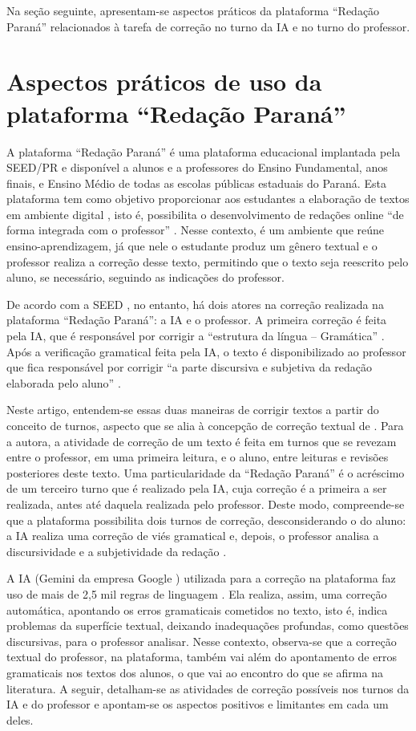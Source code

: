 \documentclass[portuguese]{textolivre}
\begin{document}
Na seção seguinte, apresentam-se aspectos práticos da plataforma ``Redação Paraná'' relacionados à tarefa de correção no turno da IA e no turno do professor.

\section{Aspectos práticos de uso da plataforma ``Redação Paraná''}
A plataforma ``Redação Paraná'' é uma plataforma educacional implantada pela SEED/PR e disponível a alunos e a professores do Ensino Fundamental, anos finais, e Ensino Médio de todas as escolas públicas estaduais do Paraná. Esta plataforma tem como objetivo proporcionar aos estudantes a elaboração de textos em ambiente digital \cite{parana2023}, isto é, possibilita o desenvolvimento de redações online ``de forma integrada com o professor'' \cite{parana2023}. Nesse contexto, é um ambiente que reúne ensino-aprendizagem, já que nele o estudante produz um gênero textual e o professor realiza a correção desse texto, permitindo que o texto seja reescrito pelo aluno, se necessário, seguindo as indicações do professor.

De acordo com a SEED \cite{parana2023}, no entanto, há dois atores na correção realizada na plataforma ``Redação Paraná'': a IA e o professor. A primeira correção é feita pela IA, que é responsável por corrigir a ``estrutura da língua -- Gramática'' \cite{parana2023}. Após a verificação gramatical feita pela IA, o texto é disponibilizado ao professor que fica responsável por corrigir ``a parte discursiva e subjetiva da redação elaborada pelo aluno'' \cite{parana2023}.

Neste artigo, entendem-se essas duas maneiras de corrigir textos a partir do conceito de turnos, aspecto que se alia à concepção de correção textual de \textcite{ruiz2015}. Para a autora, a atividade de correção de um texto é feita em turnos que se revezam entre o professor, em uma primeira leitura, e o aluno, entre leituras e revisões posteriores deste texto. Uma particularidade da ``Redação Paraná'' é o acréscimo de um terceiro turno que é realizado pela IA, cuja correção é a primeira a ser realizada, antes até daquela realizada pelo professor. Deste modo, compreende-se que a plataforma possibilita dois turnos de correção, desconsiderando o do aluno: a IA realiza uma correção de viés gramatical e, depois, o professor analisa a discursividade e a subjetividade da redação \cite{parana2023}.

A IA (Gemini da empresa Google \cite{parana2025a}) utilizada para a correção na plataforma faz uso de mais de 2,5 mil regras de linguagem \cite{parana2021a}. Ela realiza, assim, uma correção automática, apontando os erros gramaticais cometidos no texto, isto é, indica problemas da superfície textual, deixando inadequações profundas, como questões discursivas, para o professor analisar. Nesse contexto, observa-se que a correção textual do professor, na plataforma, também vai além do apontamento de erros gramaticais nos textos dos alunos, o que vai ao encontro do que se afirma na literatura. A seguir, detalham-se as atividades de correção possíveis nos turnos da IA e do professor e apontam-se os aspectos positivos e limitantes em cada um deles.
\end{document}
